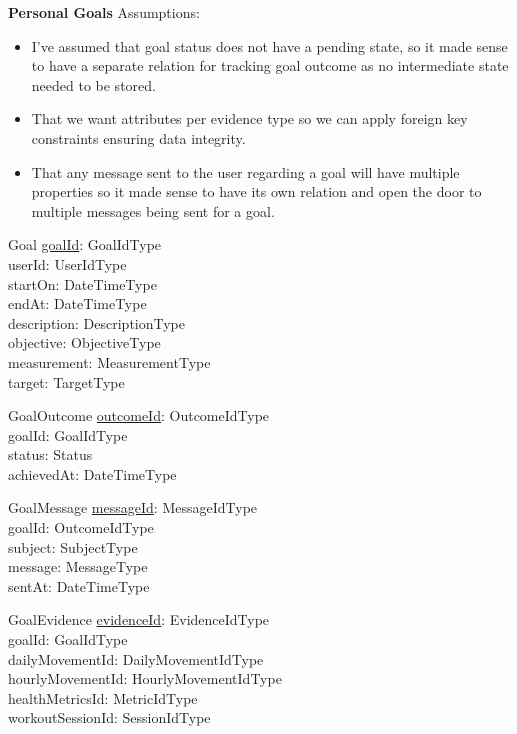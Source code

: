 \documentclass{article}
\begin{document}
\newline
\textbf{Personal Goals}
\newline \newline Assumptions:
\begin{itemize}
  \item I've assumed that goal status does not have a pending state, so it made sense to have a separate relation for tracking goal outcome as no intermediate state needed to be stored. 
  \item That we want attributes per evidence type so we can apply foreign key constraints ensuring data integrity.
  \item That any message sent to the user regarding a goal will have multiple properties so it made sense to have its own relation and open the door to multiple messages being sent for a goal.
\end{itemize}
\begin{schema}{Goal}
	\underline{goalId}: GoalIdType \\
  userId: UserIdType \\
  startOn: DateTimeType \\
  endAt: DateTimeType \\ 
  description: DescriptionType \\
  objective: ObjectiveType \\
  measurement: MeasurementType \\
  target: TargetType \\ 
\end{schema}
\vspace{-0.75cm}
\begin{schema}{GoalOutcome}
	\underline{outcomeId}: OutcomeIdType \\
  goalId: GoalIdType \\
  status: Status \\
  achievedAt: DateTimeType \\
\end{schema}
\vspace{-0.75cm}
\begin{schema}{GoalMessage}
	\underline{messageId}: MessageIdType \\
  goalId: OutcomeIdType \\
  subject: SubjectType \\
  message: MessageType \\
  sentAt: DateTimeType \\
\end{schema}
\vspace{-0.75cm}
\begin{schema}{GoalEvidence}
	\underline{evidenceId}: EvidenceIdType \\
  goalId: GoalIdType \\
  dailyMovementId: DailyMovementIdType \\
  hourlyMovementId: HourlyMovementIdType \\
  healthMetricsId: MetricIdType \\
  workoutSessionId: SessionIdType \\
\end{schema}
\end{document}
